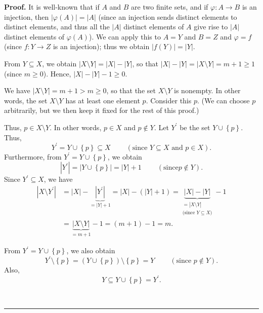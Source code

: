 \documentclass[numbers=enddot,12pt,final,onecolumn,notitlepage]{scrartcl}%
\numberwithin{exer}{section}
\theoremstyle{definition}
\newenvironment{proof}[1][Proof]{\noindent\textbf{#1.} }{\ \rule{0.5em}{0.5em}}
\newenvironment{verlong}{}{}
\begin{document}
\begin{verlong}
\begin{proof}
It is well-known that if $A$ and $B$ are two finite sets, and if
$\varphi:A\rightarrow B$ is an injection, then $\left\vert \varphi\left(
A\right)  \right\vert =\left\vert A\right\vert $ (since an injection sends
distinct elements to distinct elements, and thus all the $\left\vert
A\right\vert $ distinct elements of $A$ give rise to $\left\vert A\right\vert
$ distinct elements of $\varphi\left(  A\right)  $). We can apply this to
$A=Y$ and $B=Z$ and $\varphi=f$ (since $f:Y\rightarrow Z$ is an injection);
thus we obtain $\left\vert f\left(  Y\right)  \right\vert =\left\vert
Y\right\vert $.

From $Y\subseteq X$, we obtain $\left\vert X\setminus Y\right\vert =\left\vert
X\right\vert -\left\vert Y\right\vert $, so that $\left\vert X\right\vert
-\left\vert Y\right\vert =\left\vert X\setminus Y\right\vert =m+1\geq1$ (since
$m\geq0$). Hence, $\left\vert X\right\vert -\left\vert Y\right\vert -1\geq0$.

We have $\left\vert X\setminus Y\right\vert =m+1>m\geq0$, so that the set
$X\setminus Y$ is nonempty. In other words, the set $X\setminus Y$ has at
least one element $p$. Consider this $p$. (We can choose $p$ arbitrarily, but
we then keep it fixed for the rest of this proof.)

Thus, $p\in X\setminus Y$. In other words, $p\in X$ and $p\notin Y$. Let
$Y^{\prime}$ be the set $Y\cup\left\{  p\right\}  $. Thus,%
\[
Y^{\prime}=Y\cup\left\{  p\right\}  \subseteq X\ \ \ \ \ \ \ \ \ \ \left(
\text{since }Y\subseteq X\text{ and }p\in X\right)  .
\]
Furthermore, from $Y^{\prime}=Y\cup\left\{  p\right\}  $, we obtain%
\[
\left\vert Y^{\prime}\right\vert =\left\vert Y\cup\left\{  p\right\}
\right\vert =\left\vert Y\right\vert +1\ \ \ \ \ \ \ \ \ \ \left(  \text{since
}p\notin Y\right)  .
\]
Since $Y^{\prime}\subseteq X$, we have%
\begin{align*}
\left\vert X\setminus Y^{\prime}\right\vert  &  =\left\vert X\right\vert
-\underbrace{\left\vert Y^{\prime}\right\vert }_{=\left\vert Y\right\vert
+1}=\left\vert X\right\vert -\left(  \left\vert Y\right\vert +1\right)
=\underbrace{\left\vert X\right\vert -\left\vert Y\right\vert }%
_{\substack{=\left\vert X\setminus Y\right\vert \\\text{(since }Y\subseteq
X\text{)}}}-1\\
&  =\underbrace{\left\vert X\setminus Y\right\vert }_{=m+1}-1=\left(
m+1\right)  -1=m.
\end{align*}


From $Y^{\prime}=Y\cup\left\{  p\right\}  $, we also obtain
\[
Y^{\prime}\setminus\left\{  p\right\}  =\left(  Y\cup\left\{  p\right\}
\right)  \setminus\left\{  p\right\}  =Y\ \ \ \ \ \ \ \ \ \ \left(
\text{since }p\notin Y\right)  .
\]
Also,%
\[
Y\subseteq Y\cup\left\{  p\right\}  =Y^{\prime}.
\]



\end{proof}
\end{verlong}
\end{document}
